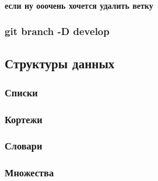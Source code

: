 \documentclass[11pt]{article}
\begin{document}
\hypertarget{ux435ux441ux43bux438-ux43dux443-ux43eux43eux43eux447ux435ux43dux44c-ux445ux43eux447ux435ux442ux441ux44f-ux443ux434ux430ux43bux438ux442ux44c-ux432ux435ux442ux43aux443}{%
\paragraph{если ну ооочень хочется удалить
ветку}\label{ux435ux441ux43bux438-ux43dux443-ux43eux43eux43eux447ux435ux43dux44c-ux445ux43eux447ux435ux442ux441ux44f-ux443ux434ux430ux43bux438ux442ux44c-ux432ux435ux442ux43aux443}}

\hypertarget{git-branch--d-develop}{%
\subsubsection{git branch -D develop}\label{git-branch--d-develop}}

    \hypertarget{ux441ux442ux440ux443ux43aux442ux443ux440ux44b-ux434ux430ux43dux43dux44bux445}{%
\subsection{Структуры
данных}\label{ux441ux442ux440ux443ux43aux442ux443ux440ux44b-ux434ux430ux43dux43dux44bux445}}

\hypertarget{ux441ux43fux438ux441ux43aux438}{%
\subsubsection{Списки}\label{ux441ux43fux438ux441ux43aux438}}

\hypertarget{ux43aux43eux440ux442ux435ux436ux438}{%
\subsubsection{Кортежи}\label{ux43aux43eux440ux442ux435ux436ux438}}

\hypertarget{ux441ux43bux43eux432ux430ux440ux438}{%
\subsubsection{Словари}\label{ux441ux43bux43eux432ux430ux440ux438}}

\hypertarget{ux43cux43dux43eux436ux435ux441ux442ux432ux430}{%
\subsubsection{Множества}\label{ux43cux43dux43eux436ux435ux441ux442ux432ux430}}
\end{document}
